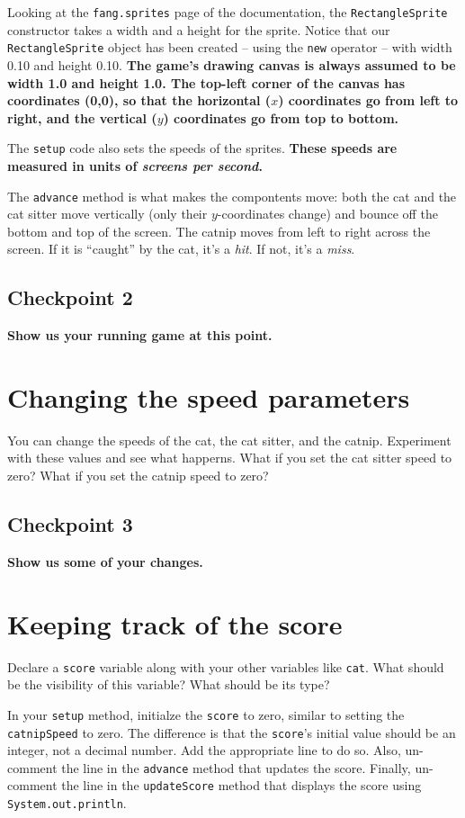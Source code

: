 \documentclass[12pt]{article}
\newcommand{\fname}[1]{\texttt{#1}}
\newcommand{\code}[1]{\texttt{#1}}
\begin{document}
Looking at the \fname{fang.sprites} page of the documentation, the
\code{RectangleSprite} constructor takes a width and a height for the
sprite.  Notice that our \code{RectangleSprite} object
has been created -- using the \code{new} operator --
with width 0.10 and height 0.10.
{\bf The game's drawing canvas is always assumed
to be width 1.0 and height 1.0.
The top-left corner of the canvas has coordinates (0,0),
so that the horizontal ($x$) coordinates go from left to right,
and the vertical ($y$) coordinates go from top to bottom.}

The \code{setup} code also sets the speeds of the sprites.
{\bf These speeds are measured in units of {\em screens per second}.}

The \code{advance} method is what makes the compontents move:
both the cat and the cat sitter move vertically
(only their $y$-coordinates change)
and bounce off the bottom and top of the screen.
The catnip moves from left to right across the screen.
If it is ``caught'' by the cat, it's a {\em hit}.
If not, it's a {\em miss}.

\subsection*{Checkpoint 2}
{\bf Show us your running game at this point.}

\section*{Changing the speed parameters}
You can change the speeds of the cat, the cat sitter, and the catnip.
Experiment with these values and see what happerns.
What if you set the cat sitter speed to zero?
What if you set the catnip speed to zero?

\subsection*{Checkpoint 3}
{\bf Show us some of your changes.}

\section*{Keeping track of the score}

Declare a \code{score} variable along with your other variables
like \code{cat}.
What should be the visibility of this variable?
What should be its type?

In your \code{setup} method,
initialze the \code{score} to zero,
similar to setting the \code{catnipSpeed} to zero.
The difference is that the \code{score}'s initial value
should be an integer, not a decimal number.
Add the appropriate line to do so.
Also, un-comment the line in the \code{advance} method
that updates the score.
Finally, un-comment the line in the \code{updateScore} method
that displays the score using \code{System.out.println}.
\end{document}
